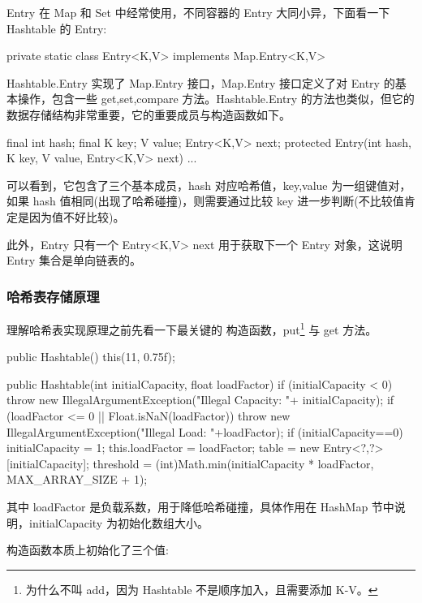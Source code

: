 Entry 在 Map 和 Set 中经常使用，不同容器的 Entry 大同小异，下面看一下 Hashtable 的 Entry:

\begin{Java}
private static class Entry<K,V> implements Map.Entry<K,V>  
\end{Java}

Hashtable.Entry 实现了 Map.Entry 接口，Map.Entry 接口定义了对 Entry 的基本操作，包含一些 get,set,compare 方法。Hashtable.Entry 的方法也类似，但它的数据存储结构非常重要，它的重要成员与构造函数如下。

\begin{Java}
final int hash;
final K key;
V value;
Entry<K,V> next;
protected Entry(int hash, K key, V value, Entry<K,V> next) {
    ...
}
\end{Java}

可以看到，它包含了三个基本成员，hash 对应哈希值，key,value 为一组键值对，如果 hash 值相同(出现了哈希碰撞)，则需要通过比较 key 进一步判断(不比较值肯定是因为值不好比较)。

此外，Entry 只有一个 Entry<K,V> next 用于获取下一个 Entry 对象，这说明 Entry 集合是单向链表的。

\subsubsection{哈希表存储原理}

理解哈希表实现原理之前先看一下最关键的 构造函数，put\footnote{为什么不叫 add，因为 Hashtable 不是顺序加入，且需要添加 K-V。} 与 get 方法。

\begin{Java}
public Hashtable() {
    this(11, 0.75f);
}

public Hashtable(int initialCapacity, float loadFactor) {
    if (initialCapacity < 0)
        throw new IllegalArgumentException("Illegal Capacity: "+
                                           initialCapacity);
    if (loadFactor <= 0 || Float.isNaN(loadFactor))
        throw new IllegalArgumentException("Illegal Load: "+loadFactor);
    if (initialCapacity==0)
        initialCapacity = 1;
    this.loadFactor = loadFactor;
    table = new Entry<?,?>[initialCapacity];
    threshold = (int)Math.min(initialCapacity * loadFactor, MAX_ARRAY_SIZE + 1);
}
\end{Java}

其中 loadFactor 是负载系数，用于降低哈希碰撞，具体作用在 HashMap 节中说明，initialCapacity 为初始化数组大小。

构造函数本质上初始化了三个值:

